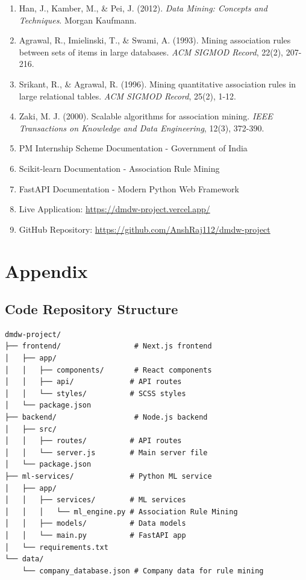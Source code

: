 \documentclass[12pt,a4paper]{article}
\begin{document}
\begin{enumerate}
    \item Han, J., Kamber, M., \& Pei, J. (2012). \textit{Data Mining: Concepts and Techniques}. Morgan Kaufmann.
    \item Agrawal, R., Imielinski, T., \& Swami, A. (1993). Mining association rules between sets of items in large databases. \textit{ACM SIGMOD Record}, 22(2), 207-216.
    \item Srikant, R., \& Agrawal, R. (1996). Mining quantitative association rules in large relational tables. \textit{ACM SIGMOD Record}, 25(2), 1-12.
    \item Zaki, M. J. (2000). Scalable algorithms for association mining. \textit{IEEE Transactions on Knowledge and Data Engineering}, 12(3), 372-390.
    \item PM Internship Scheme Documentation - Government of India
    \item Scikit-learn Documentation - Association Rule Mining
    \item FastAPI Documentation - Modern Python Web Framework
    \item Live Application: \url{https://dmdw-project.vercel.app/}
    \item GitHub Repository: \url{https://github.com/AnshRaj112/dmdw-project}
\end{enumerate}

\section{Appendix}

\subsection{Code Repository Structure}



\begin{verbatim}
dmdw-project/
├── frontend/                 # Next.js frontend
│   ├── app/
│   │   ├── components/       # React components
│   │   ├── api/             # API routes
│   │   └── styles/          # SCSS styles
│   └── package.json
├── backend/                  # Node.js backend
│   ├── src/
│   │   ├── routes/          # API routes
│   │   └── server.js        # Main server file
│   └── package.json
├── ml-services/             # Python ML service
│   ├── app/
│   │   ├── services/        # ML services
│   │   │   └── ml_engine.py # Association Rule Mining
│   │   ├── models/          # Data models
│   │   └── main.py          # FastAPI app
│   └── requirements.txt
└── data/
    └── company_database.json # Company data for rule mining
\end{verbatim}
\end{document}
